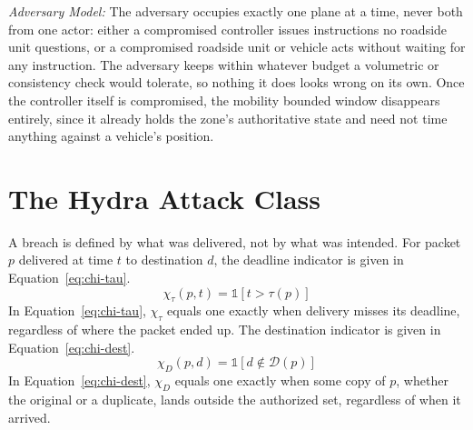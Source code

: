 \documentclass[lettersize,journal]{IEEEtran}
\begin{document}
\textit{Adversary Model:} The adversary occupies exactly one plane at a time, never both from one actor: either a compromised controller issues instructions no roadside unit questions, or a compromised roadside unit or vehicle acts without waiting for any instruction. The adversary keeps within whatever budget a volumetric or consistency check would tolerate, so nothing it does looks wrong on its own. Once the controller itself is compromised, the mobility bounded window disappears entirely, since it already holds the zone's authoritative state and need not time anything against a vehicle's position.

\section{The Hydra Attack Class}
\label{sec:attack}
A breach is defined by what was delivered, not by what was intended. For packet $p$ delivered at time $t$ to destination $d$, the deadline indicator is given in Equation~\eqref{eq:chi-tau}.
\begin{equation}
\chi_\tau(p,t) = \mathbb{1}\!\left[t > \tau(p)\right]
\label{eq:chi-tau}
\end{equation}
In Equation~\eqref{eq:chi-tau}, $\chi_\tau$ equals one exactly when delivery misses its deadline, regardless of where the packet ended up. The destination indicator is given in Equation~\eqref{eq:chi-dest}.
\begin{equation}
\chi_D(p,d) = \mathbb{1}\!\left[d \notin \mathcal{D}(p)\right]
\label{eq:chi-dest}
\end{equation}
In Equation~\eqref{eq:chi-dest}, $\chi_D$ equals one exactly when some copy of $p$, whether the original or a duplicate, lands outside the authorized set, regardless of when it arrived.
\end{document}
